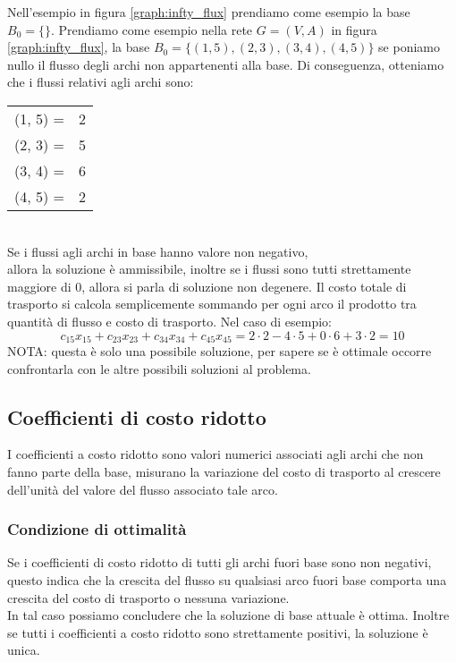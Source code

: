 \documentclass[../template]{subfiles}
\begin{document}
\vspace{10pt}
Nell'esempio in figura \ref{graph:infty_flux} prendiamo come esempio la base $B_0 = \{\}$.
Prendiamo come esempio nella rete $G = (V, A)$ in figura \ref{graph:infty_flux}, la
base $B_0 = \{(1, 5), (2, 3), (3, 4), (4, 5)\}$ se poniamo nullo il flusso degli archi
non appartenenti alla base.
Di conseguenza, otteniamo che i flussi relativi agli archi sono:

\vspace{10pt}
\begin{tabular}{cc}
    (1, 5) = &2\\
    (2, 3) = &5\\
    (3, 4) = &6\\
    (4, 5) = &2
\end{tabular}
\\[10pt]
Se i flussi agli archi in base hanno valore non negativo,
\\
allora la soluzione è ammissibile, inoltre se i flussi sono tutti strettamente
maggiore di 0, allora si parla di soluzione non degenere.
Il costo totale di trasporto si calcola semplicemente sommando per ogni arco il prodotto tra
quantità di flusso e costo di trasporto. Nel caso di esempio:
\[
    c_{15} x_{15} + c_{23} x_{23} + c_{34} x_{34} + c_{45} x_{45} =
    2 \cdot 2 - 4 \cdot 5 + 0 \cdot 6 + 3 \cdot 2 = 10
\]
NOTA: questa è solo una possibile soluzione, per sapere se è ottimale occorre confrontarla con
le altre possibili soluzioni al problema.
\subsection{Coefficienti di costo ridotto}
I coefficienti a costo ridotto sono valori numerici associati agli archi che non fanno parte della
base, misurano la variazione del costo di trasporto al crescere dell'unità del valore del flusso
associato tale arco.

\subsubsection{Condizione di ottimalità}
Se i coefficienti di costo ridotto di tutti gli archi fuori base sono non negativi, questo indica che
la crescita del flusso su qualsiasi arco fuori base comporta una crescita del costo di trasporto o
nessuna variazione.
\\
In tal caso possiamo concludere che la soluzione di base attuale è ottima.
Inoltre se tutti i coefficienti a costo ridotto sono strettamente positivi, la soluzione è unica.
\end{document}
